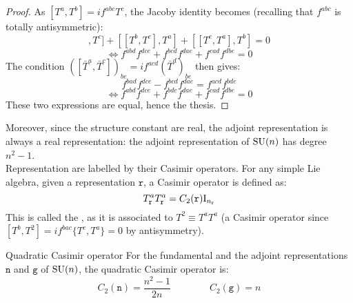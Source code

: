 \begin{proofbox}
  \begin{proof}
    As $ [T^a,T^b] = i f^{abc} T^c $, the Jacoby identity becomes (recalling that $ f^{abc} $ is totally antisymmetric):
    \begin{equation*}
      [[T^a,T^b],T^c] + [[T^b,T^c],T^a] + [[T^c,T^a],T^b] = 0
    \end{equation*}
    \begin{equation*}
      \iff f^{abd} f^{dce} + f^{bcd} f^{dae} + f^{cad} f^{dbe} = 0
    \end{equation*}
    The condition $ ([\bar{T}^a , \bar{T}^c])_{be} = i f^{acd} (\bar{T}^d)_{be} $ then gives:
    \begin{equation*}
      f^{bad} f^{dce} - f^{bcd} f^{dae} = f^{acd} f^{bde}
    \end{equation*}
    \begin{equation*}
      \iff f^{abd} f^{dce} + f^{bdc} f^{dae} + f^{cad} f^{dbe} = 0
    \end{equation*}
    These two expressions are equal, hence the thesis.
  \end{proof}
\end{proofbox}

Moreover, since the structure constant are real, the adjoint representation is always a real representation: the adjoint representation of $ \mathrm{SU}(n) $ has degree $ n^2 - 1 $.\\
Representation are labelled by their Casimir operators. For any simple Lie algebra, given a representation $ \mathtt{r} $, a Casimir operator is defined as:
\begin{equation}
  T^a_\mathtt{r} T^a_\mathtt{r} = C_2(\mathtt{r}) \mathrm{I}_{n_{\mathtt{r}}}
  \label{eq:quad-cas}
\end{equation}
This is called the , as it is associated to $ T^2 \equiv T^a T^a $ (a Casimir operator since $ [T^b, T^2] = i f^{bac} \{T^c,T^a\} = 0 $ by antisymmetry).

\begin{proposition}{Quadratic Casimir operator}{}
  For the fundamental and the adjoint representations $ \mathtt{n} $ and $ \mathtt{g} $ of $ \mathrm{SU}(n) $, the quadratic Casimir operator is:
  \begin{equation}
    C_2(\mathtt{n}) = \frac{n^2 - 1}{2n}
    \qquad \qquad
    C_2(\mathtt{g}) = n
  \end{equation}
\end{proposition}

